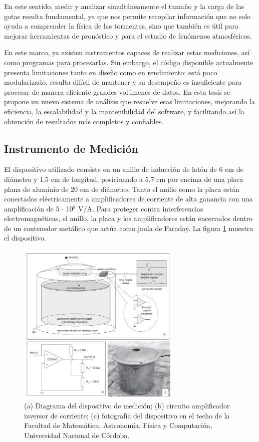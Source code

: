 \documentclass[12pt,a4paper]{article}
\begin{document}
En este sentido, medir y analizar simultáneamente el tamaño y la carga de las gotas resulta fundamental, ya que nos permite recopilar información que no solo ayuda a comprender la física de las tormentas, sino que también es útil para mejorar herramientas de pronóstico y para el estudio de fenómenos atmosféricos.

En este marco, ya existen instrumentos capaces de realizar estas mediciones, así como programas para procesarlas. Sin embargo, el código disponible actualmente presenta limitaciones tanto en diseño como en rendimiento: está poco modularizado, resulta difícil de mantener y su desempeño es insuficiente para procesar de manera eficiente grandes volúmenes de datos. En esta tesis se propone un nuevo sistema de análisis que resuelve esas limitaciones, mejorando la eficiencia, la escalabilidad y la mantenibilidad del software, y facilitando así la obtención de resultados más completos y confiables.

\subsection{Instrumento de Medición}
\lhead{}

El dispositivo utilizado consiste en un anillo de inducción de latón de 6 cm de diámetro y 1.5 cm de longitud, posicionado a 5.7 cm por encima de una placa plana de aluminio de 20 cm de diámetro. Tanto el anillo como la placa están conectados eléctricamente a amplificadores de corriente de alta ganancia con una amplificación de 5 $\cdot$ 10$^8$ V/A. Para proteger contra interferencias electromagnéticas, el anillo, la placa y los amplificadores están encerrados dentro de un contenedor metálico que actúa como jaula de Faraday. La figura \ref{fig:instrumento_medicion} muestra el dispositivo.

\begin{figure}[!hb]
    \centering
    \includegraphics[width=0.7\textwidth]{figures/instrumento_de_medicion.png}
    \caption{(a) Diagrama del dispositivo de medición; (b) circuito amplificador inversor de corriente; (c) fotografía del dispositivo en el techo de la Facultad de Matemática, Astronomía, Física y Computación, Universidad Nacional de Córdoba.}
    \label{fig:instrumento_medicion}
\end{figure}
\end{document}
